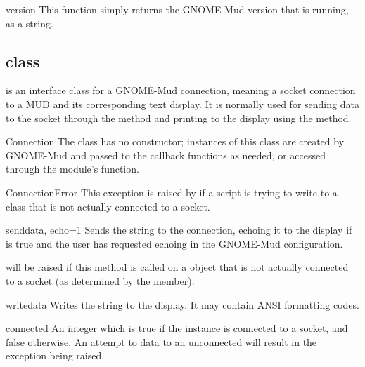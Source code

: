 \documentclass{howto}
\begin{document}
\begin{funcdesc}{version}{}
This function simply returns the GNOME-Mud version that is running, as a string.
\end{funcdesc}

\subsection{ class}
 is an interface class for a GNOME-Mud connection, meaning a socket connection to a
MUD and its corresponding text display. It is normally used for sending data to the socket through the
 method and printing to the display using the  method.

\begin{classdesc}{Connection}{}
The  class has no constructor; instances of this class are created by GNOME-Mud and
passed to the callback functions as needed, or accessed through the  module's
 function.

\begin{excdesc}{ConnectionError}
This exception is raised by  if a script is trying to write to a  class
that is not actually connected to a socket.
\end{excdesc}

\begin{methoddesc}{send}{data, echo=1}
Sends the string  to the connection, echoing it to the display if  is true and the
user has requested echoing in the GNOME-Mud configuration.

 will be raised if this method is called on a  object that
is not actually connected to a socket (as determined by the  member).
\end{methoddesc}

\begin{methoddesc}{write}{data}
Writes the string  to the display. It may contain ANSI formatting codes.
\end{methoddesc}

\begin{memberdesc}{connected}
An integer which is true if the  instance is connected to a socket, and false otherwise.
An attempt to  data to an unconnected  will result in the 
exception being raised.
\end{memberdesc}


\end{classdesc}
\end{document}
